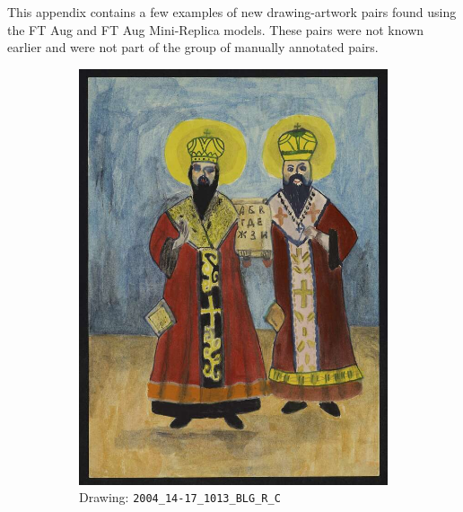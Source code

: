 This appendix contains a few examples of new drawing-artwork pairs found using the FT Aug and FT Aug Mini-Replica models. These pairs were not known earlier and were not part of the group of manually annotated pairs.

\begin{figure}
     \centering
     \begin{subfigure}[b]{0.45\textwidth}
         \centering
         \includegraphics[width=\textwidth]{images/new_discoveries/2004_14-17_1013_BLG_R_C.jpg}
         \caption{Drawing: \texttt{2004\_14-17\_1013\_BLG\_R\_C}}
         \label{fig:2004_14-17_1013_BLG_R_C}
     \end{subfigure}
     \hfill
     \begin{subfigure}[b]{0.45\textwidth}
         \centering

\end{subfigure}
\end{figure}
